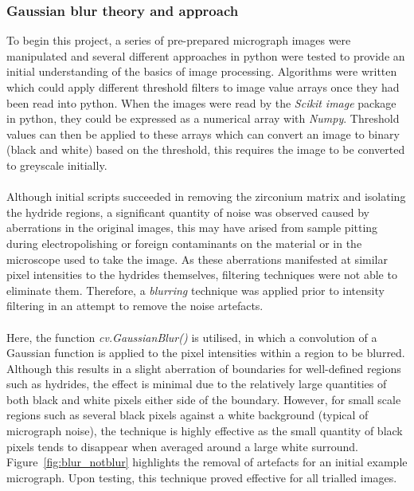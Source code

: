 \documentclass{article}
\begin{document}
	\subsubsection{Gaussian blur theory and approach}
	To begin this project, a series of pre-prepared micrograph images were manipulated and several different approaches in python were tested to provide an initial understanding of the basics of image processing. Algorithms were written which could apply different threshold filters to image value arrays once they had been read into python. When the images were read by the \textit{Scikit image} package in python, they could be expressed as a numerical array with \textit{Numpy}. Threshold values can then be applied to these arrays which can convert an image to binary (black and white) based on the threshold, this requires the image to be converted to greyscale initially.
	\\
	\\
	Although initial scripts succeeded in removing the zirconium matrix and isolating the hydride regions, a significant quantity of noise was observed caused by aberrations in the original images, this may have arised from sample pitting during electropolishing or foreign contaminants on the material or in the microscope used to take the image. As these aberrations manifested at similar pixel intensities to the hydrides themselves, filtering techniques were not able to eliminate them. Therefore, a \textit{blurring} technique was applied prior to intensity filtering in an attempt to remove the noise artefacts.
	\\
	\\
	Here, the function \textit{cv.GaussianBlur()} is utilised, in which a convolution of a Gaussian function is applied to the pixel intensities within a region to be blurred. Although this results in a slight aberration of boundaries for well-defined regions such as hydrides, the effect is minimal due to the relatively large quantities of both black and white pixels either side of the boundary. However, for small scale regions such as several black pixels against a white background (typical of micrograph noise), the technique is highly effective as the small quantity of black pixels tends to disappear when averaged around a large white surround. Figure~\ref{fig:blur_notblur} highlights the removal of artefacts for an initial example micrograph. Upon testing, this technique proved effective for all trialled images.
    
\end{document}
